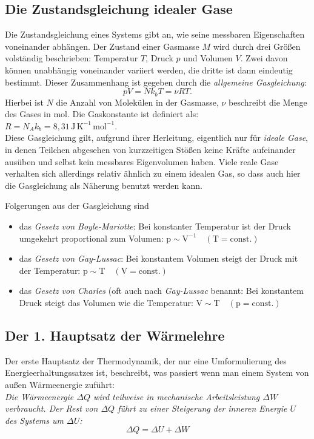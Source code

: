 \subsection{Die Zustandsgleichung idealer Gase}

Die Zustandsgleichung eines Systems gibt an, wie seine messbaren Eigenschaften voneinander abhängen. Der Zustand einer Gasmasse $M$ wird durch drei Größen volständig beschrieben: Temperatur $T$, Druck $p$ und Volumen $V$. Zwei davon können unabhängig voneinander variiert werden, die dritte ist dann eindeutig bestimmt. Dieser Zusammenhang ist gegeben durch die \textit{allgemeine Gasgleichung}:
\begin{equation}
	pV = Nk_bT = \nu RT.
\end{equation}
Hierbei ist $N$ die Anzahl von Molekülen in der Gasmasse, $\nu$ beschreibt die Menge des Gases in mol. Die Gaskonstante ist definiert als: $R = N_A k_b = 8,31\, \mathrm{J\, K^{-1}\, mol^{-1}}$.\\
Diese Gasgleichung gilt, aufgrund ihrer Herleitung, eigentlich nur für \textit{ideale Gase}, in denen Teilchen abgesehen von kurzzeitigen Stößen keine Kräfte aufeinander ausüben und selbst kein messbares Eigenvolumen haben. Viele reale Gase verhalten sich allerdings relativ ähnlich zu einem idealen Gas, so dass auch hier die Gasgleichung als Näherung benutzt werden kann.

Folgerungen aus der Gasgleichung sind
\begin{itemize}
	\item das \textit{Gesetz von Boyle-Mariotte}: Bei konstanter Temperatur ist der Druck umgekehrt proportional zum Volumen: $\mathrm{p\sim V^{-1} \quad (T=const.)}$
	\item das \textit{Gesetz von Gay-Lussac}: Bei konstantem Volumen steigt der Druck mit der Temperatur: $\mathrm{p\sim T \quad (V=const.)}$
	\item das \textit{Gesetz von Charles} (oft auch nach \textit{Gay-Lussac} benannt: Bei konstantem Druck steigt das Volumen wie die Temperatur: $\mathrm{V\sim T \quad (p=const.)}$
\end{itemize}

\subsection{Der 1. Hauptsatz der Wärmelehre}

Der erste Hauptsatz der Thermodynamik, der nur eine Umformulierung des Energieerhaltungssatzes ist, beschreibt, was passiert wenn man einem System von außen Wärmeenergie zuführt:\\
\textit{Die Wärmeenergie $\Delta Q$ wird teilweise in mechanische Arbeitsleistung $\Delta W$ verbraucht. Der Rest von $\Delta Q$ führt zu einer Steigerung der inneren Energie $U$ des Systems um $\Delta U$:}
	\begin{equation}
		\Delta Q = \Delta U + \Delta W
	\end{equation}

